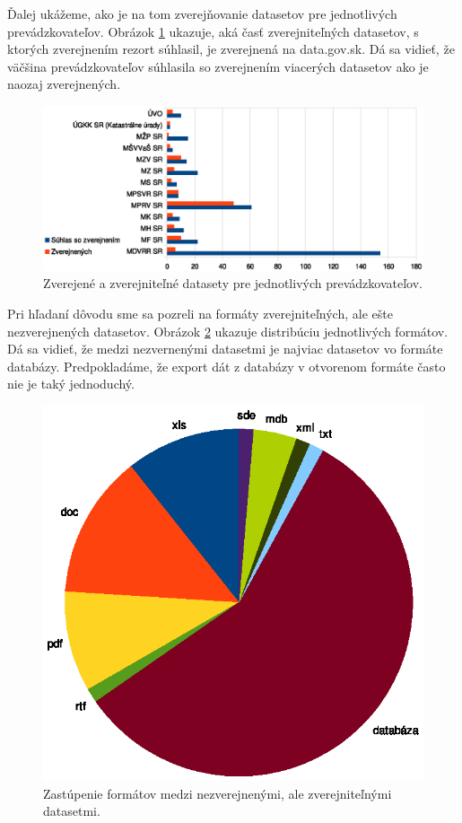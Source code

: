 \documentclass[12pt,a4paper]{article}
\begin{document}
Ďalej ukážeme, ako je na tom zverejňovanie datasetov pre jednotlivých prevádzkovateľov. Obrázok \ref{zverejnene} ukazuje, aká časť zverejniteľných datasetov, s ktorých zverejnením rezort súhlasil, je zverejnená na data.gov.sk. Dá sa vidieť, že väčšina prevádzkovateľov súhlasila so zverejnením viacerých datasetov ako je naozaj zverejnených.

\begin{figure}
\center \includegraphics[width=14cm]{zverejnene_prevadzkovatel}
\caption{Zverejené a zverejniteľné datasety pre jednotlivých prevádzkovateľov.}
\label{zverejnene}
\end{figure}

Pri hľadaní dôvodu sme sa pozreli na formáty zverejniteľných, ale ešte nezverejnených datasetov. Obrázok \ref{nezverejnene_formaty} ukazuje distribúciu jednotlivých formátov. Dá sa vidieť, že medzi nezvernenými datasetmi je najviac datasetov vo formáte databázy. Predpokladáme, že export dát z databázy v otvorenom formáte často nie je taký jednoduchý.

\begin{figure}
\center \includegraphics[width=14cm]{nezverejnene_formaty}
\caption{Zastúpenie formátov medzi nezverejnenými, ale zverejniteľnými datasetmi.}
\label{nezverejnene_formaty}
\end{figure}
\end{document}
